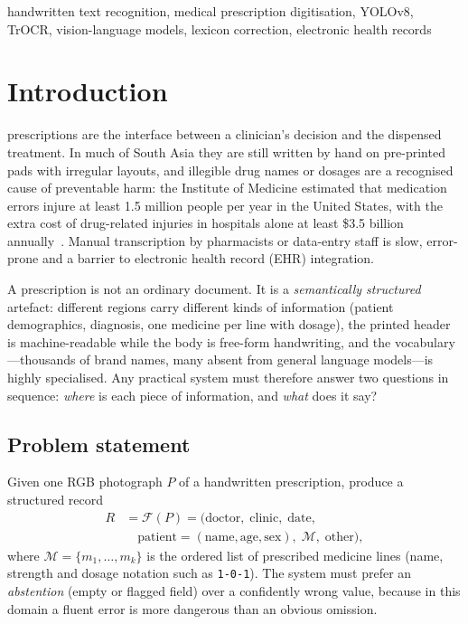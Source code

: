 \documentclass[journal]{IEEEtran}
\begin{document}
\begin{IEEEkeywords}
handwritten text recognition, medical prescription digitisation, YOLOv8, TrOCR, vision-language models, lexicon correction, electronic health records
\end{IEEEkeywords}

\section{Introduction}\label{sec:intro}
 prescriptions are the interface between a clinician's decision and the dispensed treatment. In much of South Asia they are still written by hand on pre-printed pads with irregular layouts, and illegible drug names or dosages are a recognised cause of preventable harm: the Institute of Medicine estimated that medication errors injure at least 1.5 million people per year in the United States, with the extra cost of drug-related injuries in hospitals alone at least \$3.5 billion annually~\cite{iom2007medicationerrors}. Manual transcription by pharmacists or data-entry staff is slow, error-prone and a barrier to electronic health record (EHR) integration.

A prescription is not an ordinary document. It is a \emph{semantically structured} artefact: different regions carry different kinds of information (patient demographics, diagnosis, one medicine per line with dosage), the printed header is machine-readable while the body is free-form handwriting, and the vocabulary---thousands of brand names, many absent from general language models---is highly specialised. Any practical system must therefore answer two questions in sequence: \emph{where} is each piece of information, and \emph{what} does it say?

\subsection{Problem statement}
Given one RGB photograph $P$ of a handwritten prescription, produce a structured record
\begin{equation}
\begin{split}
R&=\mathcal{F}(P)=\bigl(\text{doctor},\;\text{clinic},\;\text{date},\\
&\quad\text{patient}\!=\!(\text{name},\text{age},\text{sex}),\;\mathcal{M},\;\text{other}\bigr),
\end{split}
\label{eq:problem}
\end{equation}
where $\mathcal{M}=\{m_1,\dots,m_k\}$ is the ordered list of prescribed medicine lines (name, strength and dosage notation such as \texttt{1-0-1}). The system must prefer an \emph{abstention} (empty or flagged field) over a confidently wrong value, because in this domain a fluent error is more dangerous than an obvious omission.
\end{document}
